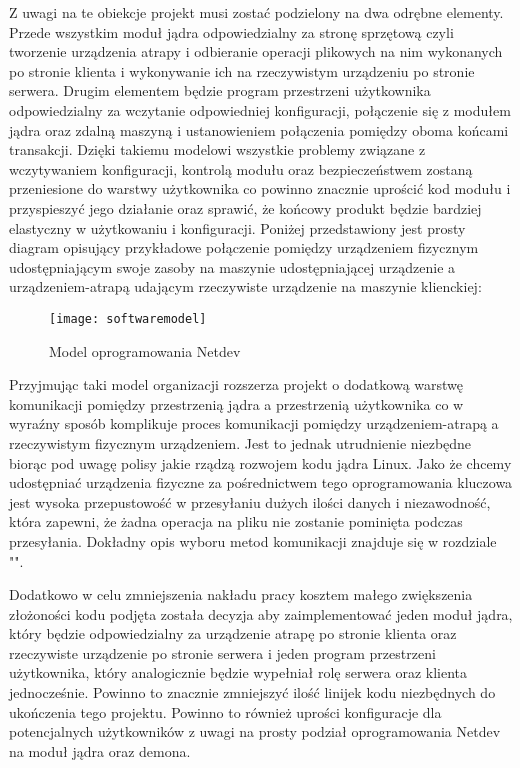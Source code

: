 \documentclass[10pt]{scrartcl}
\begin{document}
Z uwagi na te obiekcje projekt musi zostać podzielony na dwa odrębne elementy. Przede wszystkim moduł jądra odpowiedzialny za stronę sprzętową czyli tworzenie urządzenia atrapy i odbieranie operacji plikowych na nim wykonanych po stronie klienta i wykonywanie ich na rzeczywistym urządzeniu po stronie serwera. Drugim elementem będzie program przestrzeni użytkownika odpowiedzialny za wczytanie odpowiedniej konfiguracji, połączenie się z modułem jądra oraz zdalną maszyną i ustanowieniem połączenia pomiędzy oboma końcami transakcji. Dzięki takiemu modelowi wszystkie problemy związane z wczytywaniem konfiguracji, kontrolą modułu oraz bezpieczeństwem zostaną przeniesione do warstwy użytkownika co powinno znacznie uprościć kod modułu i przyspieszyć jego działanie oraz sprawić, że końcowy produkt będzie bardziej elastyczny w użytkowaniu i konfiguracji. Poniżej przedstawiony jest prosty diagram opisujący przykładowe połączenie pomiędzy urządzeniem fizycznym udostępniającym swoje zasoby na maszynie udostępniającej urządzenie a urządzeniem-atrapą udającym rzeczywiste urządzenie na maszynie klienckiej:

\begin{figure}[H]
    \caption{Model oprogramowania Netdev}
    \texttt{[image: softwaremodel]}
\end{figure}

Przyjmując taki model organizacji rozszerza projekt o dodatkową warstwę komunikacji pomiędzy przestrzenią jądra a przestrzenią użytkownika co w wyraźny sposób komplikuje proces komunikacji pomiędzy urządzeniem-atrapą a rzeczywistym fizycznym urządzeniem. Jest to jednak utrudnienie niezbędne biorąc pod uwagę polisy jakie rządzą rozwojem kodu jądra Linux. Jako że chcemy udostępniać urządzenia fizyczne za pośrednictwem tego oprogramowania kluczowa jest wysoka przepustowość w przesyłaniu dużych ilości danych i niezawodność, która zapewni, że żadna operacja na pliku nie zostanie pominięta podczas przesyłania. Dokładny opis wyboru metod komunikacji znajduje się w rozdziale "".

Dodatkowo w celu zmniejszenia nakładu pracy kosztem małego zwiększenia złożoności kodu podjęta została decyzja aby zaimplementować jeden moduł jądra, który będzie odpowiedzialny za urządzenie atrapę po stronie klienta oraz rzeczywiste urządzenie po stronie serwera i jeden program przestrzeni użytkownika, który analogicznie będzie wypełniał rolę serwera oraz klienta jednocześnie. Powinno to znacznie zmniejszyć ilość linijek kodu niezbędnych do ukończenia tego projektu. Powinno to również uprości konfiguracje dla potencjalnych użytkowników z uwagi na prosty podział oprogramowania Netdev na moduł jądra oraz demona.
\end{document}
